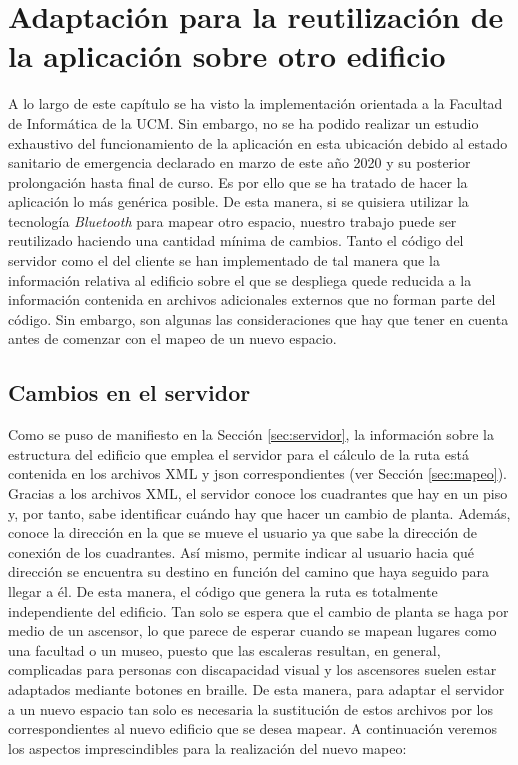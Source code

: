 \section{Adaptación para la reutilización de la aplicación sobre otro edificio}
\label{sec:adaptacion}

A lo largo de este capítulo se ha visto la implementación orientada a la Facultad de Informática de la UCM. Sin embargo, no se ha podido realizar un estudio exhaustivo del funcionamiento de la aplicación en esta ubicación debido al estado sanitario de emergencia declarado en marzo de este año 2020 y su posterior prolongación hasta final de curso. Es por ello que se ha tratado de hacer la aplicación lo más genérica posible. De esta manera, si se quisiera utilizar la tecnología \textit{Bluetooth} para mapear otro espacio, nuestro trabajo puede ser reutilizado haciendo una cantidad mínima de cambios. Tanto el código del servidor como el del cliente se han implementado de tal manera que la información relativa al edificio sobre el que se despliega quede reducida a la información contenida en archivos adicionales externos que no forman parte del código. Sin embargo, son algunas las consideraciones que hay que tener en cuenta antes de comenzar con el mapeo de un nuevo espacio. 



\subsection{Cambios en el servidor}
\label{sub:cambiosServidor}

Como se puso de manifiesto en la Sección \ref{sec:servidor}, la información sobre la estructura del edificio que emplea el servidor para el cálculo de la ruta está contenida en los archivos XML y json correspondientes (ver Sección \ref{sec:mapeo}). Gracias a los archivos XML, el servidor conoce los cuadrantes que hay en un piso y, por tanto, sabe identificar cuándo hay que hacer un cambio de planta. Además, conoce la dirección en la que se mueve el usuario ya que sabe la dirección de conexión de los cuadrantes. Así mismo, permite indicar al usuario hacia qué dirección se encuentra su destino en función del camino que haya seguido para llegar a él. De esta manera, el código que genera la ruta es totalmente independiente del edificio. Tan solo se espera que el cambio de planta se haga por medio de un ascensor, lo que parece de esperar cuando se mapean lugares como una facultad o un museo, puesto que las escaleras resultan, en general, complicadas para personas con discapacidad visual y los ascensores suelen estar adaptados mediante botones en braille. De esta manera, para adaptar el servidor a un nuevo espacio tan solo es necesaria la sustitución de estos archivos por los correspondientes al nuevo edificio que se desea mapear. A continuación veremos los aspectos imprescindibles para la realización del nuevo mapeo:


